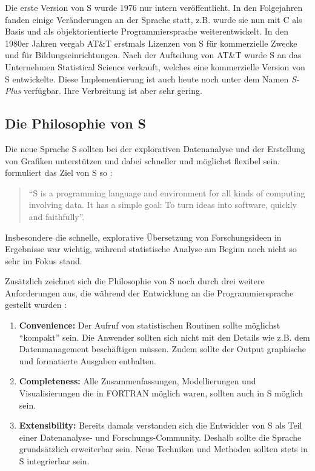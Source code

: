 \documentclass[
]{book}
\begin{document}
Die erste Version von S wurde 1976 nur intern veröffentlicht. In den Folgejahren fanden einige
Veränderungen an der Sprache statt, z.B. wurde sie nun mit C als Basis und als objektorientierte
Programmiersprache weiterentwickelt. In den 1980er Jahren vergab AT\&T erstmals Lizenzen von S für
kommerzielle Zwecke und für Bildungseinrichtungen.
Nach der Aufteilung von AT\&T wurde S an das Unternehmen Statistical Science verkauft, welches eine kommerzielle Version von S entwickelte.
Diese Implementierung ist auch heute noch unter dem Namen \emph{S-Plus} verfügbar.
Ihre Verbreitung ist aber sehr gering.

\hypertarget{die-philosophie-von-s}{%
\subsection{Die Philosophie von S}\label{die-philosophie-von-s}}

Die neue Sprache S sollten bei der explorativen Datenanalyse und der Erstellung von Grafiken unterstützen
und dabei schneller und möglichst flexibel sein.
\citet{Chambers_2000} formuliert das Ziel von S so :

\begin{quote}
``S is a programming language and environment for all kinds of computing involving data. It has a simple goal: To turn ideas into software, quickly and faithfully''.
\end{quote}

Insbesondere die schnelle, explorative Übersetzung von Forschungsideen in Ergebnisse war wichtig, während statistische Analyse am Beginn noch nicht so sehr im Fokus stand.

Zusätzlich zeichnet sich die Philosophie von S noch durch drei weitere Anforderungen aus, die
während der Entwicklung an die Programmiersprache gestellt wurden \citep[S. 84:5]{Chambers_2020}:

\begin{enumerate}
\def\labelenumi{\arabic{enumi}.}
\item
  \textbf{Convenience:} Der Aufruf von statistischen Routinen sollte möglichst ``kompakt'' sein. Die Anwender sollten sich nicht mit den Details wie z.B. dem Datenmanagement beschäftigen müssen. Zudem sollte der Output graphische und formatierte Ausgaben enthalten.
\item
  \textbf{Completeness:} Alle Zusammenfassungen, Modellierungen und Visualisierungen die in FORTRAN möglich waren, sollten auch in S möglich sein.
\item
  \textbf{Extensibility:} Bereits damals verstanden sich die Entwickler von S als Teil einer Datenanalyse- und
  Forschungs-Community.
  Deshalb sollte die Sprache grundsätzlich erweiterbar sein. Neue Techniken und Methoden sollten stets in S integrierbar sein.
\end{enumerate}
\end{document}
